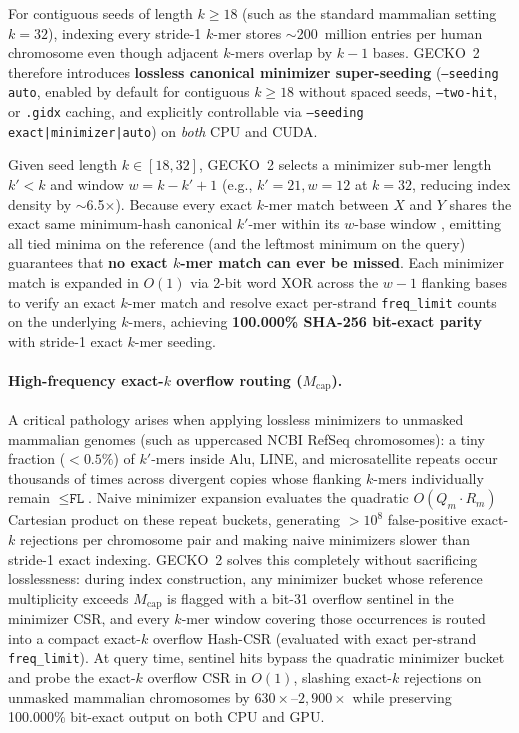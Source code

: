 \documentclass[pdflatex,sn-vancouver,Numbered]{sn-jnl}
\begin{document}
For contiguous seeds of length $k \ge 18$ (such as the standard mammalian setting $k=32$), indexing every stride-1 $k$-mer stores $\sim$200~million entries per human chromosome even though adjacent $k$-mers overlap by $k-1$ bases. GECKO~2 therefore introduces \textbf{lossless canonical minimizer super-seeding} (\texttt{--seeding auto}, enabled by default for contiguous $k \ge 18$ without spaced seeds, \texttt{--two-hit}, or \texttt{.gidx} caching, and explicitly controllable via \texttt{--seeding exact|minimizer|auto}) on \emph{both} CPU and CUDA.

Given seed length $k \in [18, 32]$, GECKO~2 selects a minimizer sub-mer length $k' < k$ and window $w = k - k' + 1$ (e.g., $k'=21, w=12$ at $k=32$, reducing index density by $\sim$6.5$\times$). Because every exact $k$-mer match between $X$ and $Y$ shares the exact same minimum-hash canonical $k'$-mer within its $w$-base window \cite{roberts2004minimizers}, emitting all tied minima on the reference (and the leftmost minimum on the query) guarantees that \textbf{no exact $k$-mer match can ever be missed}. Each minimizer match is expanded in $O(1)$ via 2-bit word XOR across the $w-1$ flanking bases to verify an exact $k$-mer match and resolve exact per-strand \texttt{freq\_limit} counts on the underlying $k$-mers, achieving \textbf{100.000\% SHA-256 bit-exact parity} with stride-1 exact $k$-mer seeding.

\paragraph{High-frequency exact-$k$ overflow routing ($M_{\text{cap}}$).}
A critical pathology arises when applying lossless minimizers to unmasked mammalian genomes (such as uppercased NCBI RefSeq chromosomes): a tiny fraction ($<0.5\%$) of $k'$-mers inside Alu, LINE, and microsatellite repeats occur thousands of times across divergent copies whose flanking $k$-mers individually remain $\le \texttt{FL}$. Naive minimizer expansion evaluates the quadratic $O(Q_m \cdot R_m)$ Cartesian product on these repeat buckets, generating $>10^8$ false-positive exact-$k$ rejections per chromosome pair and making naive minimizers slower than stride-1 exact indexing. GECKO~2 solves this completely without sacrificing losslessness: during index construction, any minimizer bucket whose reference multiplicity exceeds $M_{\text{cap}}$ is flagged with a bit-31 overflow sentinel in the minimizer CSR, and every $k$-mer window covering those occurrences is routed into a compact exact-$k$ overflow Hash-CSR (evaluated with exact per-strand \texttt{freq\_limit}). At query time, sentinel hits bypass the quadratic minimizer bucket and probe the exact-$k$ overflow CSR in $O(1)$, slashing exact-$k$ rejections on unmasked mammalian chromosomes by $630\times$--$2,900\times$ while preserving 100.000\% bit-exact output on both CPU and GPU.
\end{document}
